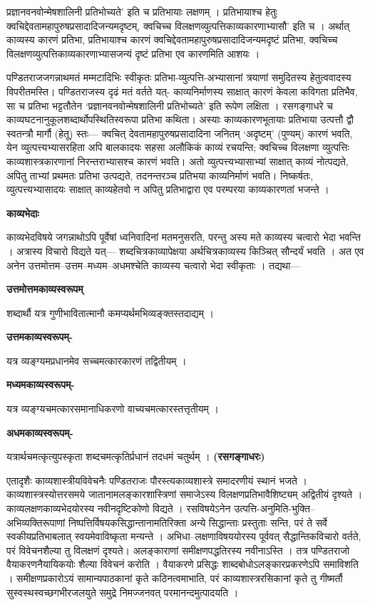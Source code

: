 \documentclass[10pt, a5paper, twoside]{article}
\newcommand{\customparagraph}[1]{
    \noindent \textbf{#1} \par
    \penalty 10000 %
    \vspace{0.1cm plus 0.05cm minus 0.02cm}
    \penalty 10000 %
}
\begin{document}
प्रज्ञानवनवोन्मेषशालिनी प्रतिभोच्यते’ इति च प्रतिभायाः लक्षणम् । प्रतिभायाश्च हेतुः क्वचिद्देवतामहापुरुषप्रसादादिजन्यमदृष्टम्, क्वचिच्च विलक्षणव्युत्पत्तिकाव्यकारणाभ्यासौ’ इति च । अर्थात् काव्यस्य कारणं प्रतिभा, प्रतिभायाश्च कारणं क्वचिद्देवतामहापुरुषप्रसादादिजन्यमदृष्टं प्रतिभा, क्वचिच्च विलक्षणव्युत्पत्तिकाव्यकारणाभ्यासजन्यं दृष्टं प्रतिभा एव कारणमिति आशयः ।

पण्डितराजजगन्नाथमतं मम्मटादिभिः स्वीकृतः प्रतिभा-व्युत्पत्ति-अभ्यासानां त्रयाणां समुदितस्य हेतुत्ववादस्य विपरीतमस्ति। पण्डितराजस्य दृढं मतं वर्तते यत्- काव्यनिर्माणस्य साक्षात् कारणं केवला कविगता प्रतिभैव, सा च प्रतिभा भट्टतौतेन `प्रज्ञानवनवोन्मेषशालिनी प्रतिभोच्यते' इति रूपेण लक्षिता । रसगङ्गाधरे च काव्यघटनानुकूलशब्दार्थोपस्थितिस्वरूपा प्रतिभा कथिता। अस्याः काव्यकारणभूतायाः प्रतिभाया उत्पत्तौ द्वौ स्वतन्त्रौ मार्गौ (हेतू) स्तः— क्वचित् देवतामहापुरुषप्रसादादिना जनितम् `अदृष्टम्' (पुण्यम्) कारणं भवति, येन व्युत्पत्त्यभ्यासरहिता अपि बालकादयः सहसा अलौकिकं काव्यं रचयन्ति; क्वचिच्च विलक्षणा व्युत्पत्तिः काव्यशास्त्रकारणानां निरन्तराभ्यासश्च कारणं भवति। अतो व्युत्पत्त्यभ्यासाभ्यां साक्षात् काव्यं नोत्पद्यते, अपितु ताभ्यां प्रथमतः प्रतिभा उत्पद्यते, तदनन्तरञ्च प्रतिभया काव्यनिर्माणं भवति। निष्कर्षतः, व्युत्पत्त्यभ्यासादयः साक्षात् काव्यहेतवो न अपितु प्रतिभाद्वारा एव परम्परया काव्यकारणतां भजन्ते ।

\customparagraph{\textbf{काव्यभेदाः}}

काव्यभेदविषये जगन्नाथोऽपि पूर्वेषां ध्वनिवादिनां मतमनुसरति, परन्तु अस्य मते काव्यस्य चत्वारो भेदा भवन्ति । अत्रास्य विचारो विद्यते यत्— शब्दचित्रकाव्यापेक्षया अर्थचित्रकाव्यस्य किञ्चित् सौन्दर्यं भवति । अत एव अनेन उत्तमोत्तम–उत्तम–मध्यम–अधमश्चेति काव्यस्य चत्वारो भेदा स्वीकृताः । तद्यथा—

\textbf{उत्तमोत्तमकाव्यस्वरूपम्}

शब्दार्थौ यत्र गुणीभावितात्मानौ कमप्यर्थमभिव्यङ्क्तस्तदाद्यम् ।

\textbf{उत्तमकाव्यस्वरूपम्-}

यत्र व्यङ्ग्यमप्रधानमेव सच्चमत्कारकारणं तद्वितीयम् ।

\textbf{मध्यमकाव्यस्वरूपम्-}

यत्र व्यङ्ग्यचमत्कारसमानाधिकरणो वाच्यचमत्कारस्तत्तृतीयम् ।

\textbf{अधमकाव्यस्वरूपम्-}

यत्रार्थचमत्कृत्युपस्कृता शब्दचमत्कृतिर्प्रधानं तदधमं चतुर्थम् । \textbf{(रसगङ्गाधरः)}

एतादृशैः काव्यशास्त्रीयविवेचनैः पण्डितराजः पौरस्त्यकाव्यशास्त्रे समादरणीयं स्थानं भजते । काव्यशास्त्रस्योत्तरसमये जातानामलङ्कारशास्त्रिणां समाजेऽस्य विलक्षणप्रतिभावैशिष्ट्यम् अद्वितीयं दृश्यते । काव्यलक्षणकाव्यभेदयोरस्य नवीनदृष्टिकोणो विद्यते । रसविषयेऽनेन उत्पत्ति-अनुमिति-भुक्ति–अभिव्यक्तिरूपाणां निष्पत्तिर्विषयकसिद्धान्तानामतिरिक्ता अन्ये सिद्धान्ताः प्रस्तुताः सन्ति, परं ते सर्वे स्वकीयप्रतिभाबलात् स्वयमेवाविष्कृता मन्यन्ते । अभिधा–लक्षणाविषययोरस्य पूर्ववत् सैद्धान्तिकविचारो वर्तते, परं विवेचनशैल्या तु विलक्षणं दृश्यते। अलङ्काराणां समीक्षणपद्धतिरस्य नवीनाऽस्ति ।  तत्र पण्डितराजो वैयाकरणनैयायिकयोः शैल्या विवेचनं करोति । वैयाकरणे प्रसिद्धः शाब्दबोधोऽलङ्कारप्रकरणेऽपि समाविशति । समीक्षणप्रकारोऽयं सामान्यपाठकानां कृते कठिनत्वमाभाति, परं काव्यशास्त्ररसिकानां कृते तु गीष्मर्तौ सुस्वस्थस्वच्छगभीरजलयुते समुद्रे निमज्जनवत्  परमानन्दमुत्पादयति ।
\end{document}
